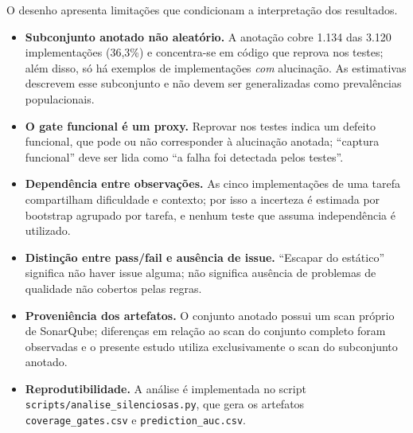 O desenho apresenta limitações que condicionam a interpretação dos resultados.
\begin{itemize}
    \item \textbf{Subconjunto anotado não aleatório.} A anotação cobre 1.134 das 3.120 implementações (36,3\%) e concentra-se em código que reprova nos testes; além disso, só há exemplos de implementações \textit{com} alucinação. As estimativas descrevem esse subconjunto e não devem ser generalizadas como prevalências populacionais.
    \item \textbf{O gate funcional é um proxy.} Reprovar nos testes indica um defeito funcional, que pode ou não corresponder à alucinação anotada; ``captura funcional'' deve ser lida como ``a falha foi detectada pelos testes''.
    \item \textbf{Dependência entre observações.} As cinco implementações de uma tarefa compartilham dificuldade e contexto; por isso a incerteza é estimada por bootstrap agrupado por tarefa, e nenhum teste que assuma independência é utilizado.
    \item \textbf{Distinção entre pass/fail e ausência de issue.} ``Escapar do estático'' significa não haver issue alguma; não significa ausência de problemas de qualidade não cobertos pelas regras.
    \item \textbf{Proveniência dos artefatos.} O conjunto anotado possui um scan próprio de SonarQube; diferenças em relação ao scan do conjunto completo foram observadas e o presente estudo utiliza exclusivamente o scan do subconjunto anotado.
    \item \textbf{Reprodutibilidade.} A análise é implementada no script \texttt{scripts/analise\_silenciosas.py}, que gera os artefatos \texttt{coverage\_gates.csv} e \texttt{prediction\_auc.csv}.
\end{itemize}
